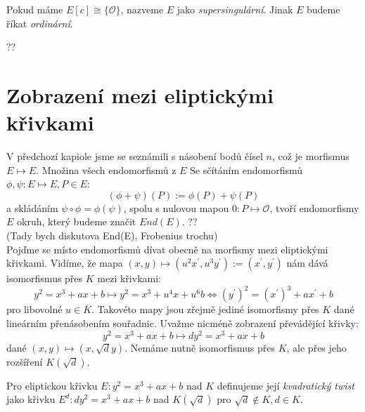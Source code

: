 \documentclass [12pt]{report}
\begin{document}
\begin{definice}
Pokud máme $E[c] \cong \lbrace \mathcal{O} \rbrace $, nazveme $E$ jako \textit{supersingulární}. Jinak $E$ budeme říkat \textit{ordinární}.
\end{definice}

??

\section{Zobrazení mezi eliptickými křivkami}

V předchozí kapiole jsme se seznámili s násobení bodů čísel $n$, což je morfismus $E \mapsto E$. Množina všech endomorfismů z $E$ Se sčítáním endomorfismů $\phi,\psi : E \mapsto E, P \in E$:
\begin{equation*}
(\phi + \psi)(P) := \phi(P) + \psi(P)
\end{equation*}
a skládáním $\psi \circ \phi = \phi(\psi)$, spolu s nulovou mapou $0: P \mapsto \mathcal{O}$, tvoří endomorfismy $E$ okruh, který budeme značit $End(E)$. ??\\

(Tady bych diskutova End(E), Frobenius  trochu)\\

Pojďme se místo endomorfismů dívat obecně na morfismy mezi eliptickými křivkami. Vidíme, že mapa $(x,y) \mapsto (u^2 x^\prime, u^3 y^\prime) := (x^\prime, y^\prime)$ nám dává isomorfismus přes $K$ mezi křivkami:
\begin{equation*}
y^2 = x^3 + ax + b \mapsto y^2 = x^3 + u^4 x + u^6 b \Leftrightarrow (y^\prime)^2 = (x^\prime)^3 + a x^\prime + b
\end{equation*}
pro libovolné $u \in \overline{K}$. Takovéto mapy jsou zřejmě jediné isomorfismy přes $K$ dané lineárním přenásobením souřadnic. Uvažme nicméně zobrazení převádějící křivky:
\begin{equation*}
y^2 = x^3 + ax +b \mapsto d y^2 = x^3 + ax + b
\end{equation*}
dané $(x,y) \mapsto (x,\sqrt{d}y)$. Nemáme nutně isomorfismus přes $K$, ale přes jeho rozšíření $K(\sqrt{d})$. 
\begin{definice}
Pro eliptickou křivku $E: y^2 = x^3 + ax + b$ nad $K$ definujeme její \textit{kvadratický twist} jako křivku $E^d: d y^2 = x^3 + ax + b$ nad $K(\sqrt{d})$ pro $\sqrt{d} \not\in K, d \in K$. 
\end{definice}
\end{document}

